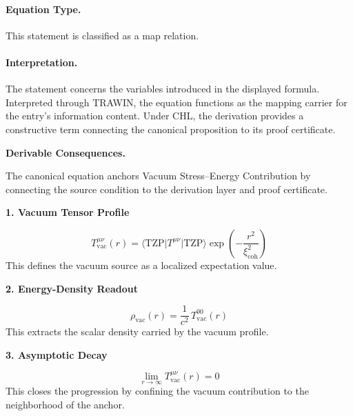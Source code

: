 \paragraph{Equation Type.}
This statement is classified as a map relation.

\paragraph{Interpretation.}
The statement concerns the variables introduced in the displayed formula. Interpreted through TRAWIN, the equation functions as the mapping carrier for the entry’s information content. Under CHL, the derivation provides a constructive term connecting the canonical proposition to its proof certificate.

\par\vspace{0.35em}
\noindent\textbf{Derivable Consequences.}\quad
\begingroup
\footnotesize
\raggedright
The canonical equation anchors Vacuum Stress--Energy Contribution by connecting the source condition to the derivation layer and proof certificate.
\par\endgroup

\noindent\textbf{1. Vacuum Tensor Profile}\par
\[
T_{\mathrm{vac}}^{\mu\nu}(r)
=
\langle \mathrm{TZP}\vert T^{\mu\nu}\vert \mathrm{TZP}\rangle
\exp\!\left(-\frac{r^2}{\xi_{\mathrm{coh}}^2}\right)
\]
\noindent This defines the vacuum source as a localized expectation value.\par
\noindent\textbf{2. Energy-Density Readout}\par
\[
\rho_{\mathrm{vac}}(r)=\frac{1}{c^2}\,T_{\mathrm{vac}}^{00}(r)
\]
\noindent This extracts the scalar density carried by the vacuum profile.\par
\noindent\textbf{3. Asymptotic Decay}\par
\[
\lim_{r\to\infty} T_{\mathrm{vac}}^{\mu\nu}(r)=0
\]
\noindent This closes the progression by confining the vacuum contribution to the neighborhood of the anchor.\par

